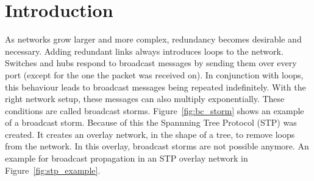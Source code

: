 \chapter{Introduction}
As networks grow larger and more complex, redundancy becomes desirable and necessary.
Adding redundant links always introduces loops to the network.
Switches and hubs respond to broadcast messages by sending them over every port (except for the one the packet was received on).
In conjunction with loops, this behaviour leads to broadcast messages being repeated indefinitely.
With the right network setup, these messages can also multiply exponentially. 
These conditions are called broadcast storms\cite{bstorm}.
Figure~\ref{fig:bc_storm} shows an example of a broadcast storm.
Because of this the Spannning Tree Protocol (STP)\cite{perlman85} was created.
It creates an overlay network, in the shape of a tree, to remove loops from the network.
In this overlay, broadcast storms are not possible anymore.
An example for broadcast propagation in an STP overlay network in Figure~\ref{fig:stp_example}.

